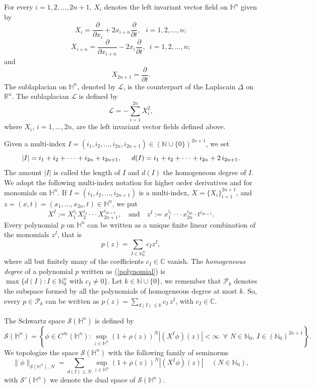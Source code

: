 \documentclass[oneside,10pt]{article}
\begin{document}
For every $i = 1,2, ..., 2n+1$, $X_i$ denotes the left invariant vector field on $\mathbb{H}^n$ given by
\[
X_i = \frac{\partial}{\partial x_i} + 2 x_{i+n} \frac{\partial}{\partial t}, \,\,\,\, i=1, 2, ..., n;
\]
\[
X_{i+n} = \frac{\partial}{\partial x_{i+n}} - 2 x_{i} \frac{\partial}{\partial t}, \,\,\, i=1, 2, ..., n;
\]
and
\[
X_{2n+1} = \frac{\partial}{\partial t}.
\]
The sublaplacian on $\mathbb{H}^n$, denoted by $\mathcal{L}$, is the counterpart of the Laplacain $\Delta$ on $\mathbb{R}^n$. The sublaplacian $\mathcal{L}$ is defined by
\[
\mathcal{L} =- \sum_{i=1}^{2n} X_i^2,
\]
where $X_i$, $i= 1, ..., 2n$, are the left invariant vector fields defined above.

Given a multi-index $I=(i_1,i_2, ..., i_{2n}, i_{2n+1}) \in (\mathbb{N} \cup \{ 0 \})^{2n+1}$, we set
\[
|I| = i_1 + i_2 + \cdot \cdot \cdot + i_{2n} + i_{2n+1}, \hspace{.5cm} d(I) = i_1 + i_2 + \cdot \cdot \cdot + i_{2n} + 2 \, i_{2n+1}.
\]
The amount $|I|$ is called the length of $I$ and $d(I)$ the homogeneous degree of $I$. We adopt the following multi-index notation for
higher order derivatives and for monomials on $\mathbb{H}^{n}$. If $I=(i_1, i_2, ..., i_{2n+1})$ is a multi-index, 
$X = \{ X_i \}_{i=1}^{2n+1}$, and $z = (x,t) = (x_1, ..., x_{2n}, t) \in \mathbb{H}^{n}$, we put
\[
X^{I} := X_{1}^{i_1} X_{2}^{i_2} \cdot \cdot \cdot X_{2n+1}^{i_{2n+1}}, \,\,\,\,\,\, \text{and} \,\,\,\,\,\,
z^{I} := x_{1}^{i_1} \cdot \cdot \cdot x_{2n}^{i_{2n}} \cdot t^{i_{2n+1}}.
\]
Every polynomial $p$ on $\mathbb{H}^n$ can be written as a unique finite linear combination of the monomials $z^I$, that is
\begin{equation} \label{polynomial}
p(z) = \sum_{I \in \mathbb{N}_{0}^n} c_I z^I,
\end{equation}
where all but finitely many of the coefficients $c_I \in \mathbb{C}$ vanish. The \textit{homogeneous degree} of a polynomial $p$ written as 
(\ref{polynomial}) is $\max \{ d(I) : I \in \mathbb{N}_{0}^n \,\, \text{with} \,\, c_I \neq 0 \}$. Let $k \in \mathbb{N} \cup \{ 0 \}$, we 
remember that $\mathcal{P}_{k}$ denotes the subspace formed by all the polynomials of homogeneous degree at most $k$. So, every 
$p \in \mathcal{P}_{k}$ can be written as $p(z) = \sum_{d(I) \leq k} c_I \, z^I$, with $c_I \in \mathbb{C}$.

The Schwartz space $\mathcal{S}(\mathbb{H}^{n})$ is defined by
\[
\mathcal{S}(\mathbb{H}^{n}) = \left\{ \phi \in C^{\infty}(\mathbb{H}^{n}) : \sup_{z \in \mathbb{H}^{n}} (1+\rho(z))^{N} 
|(X^{I} \phi)(z)| < \infty \,\,\, \forall \,\, N \in \mathbb{N}_{0}, \, I \in (\mathbb{N}_{0})^{2n+1}  \right\}.
\]
We topologize the space $\mathcal{S}(\mathbb{H}^{n})$ with the following family of seminorms
\[
\| \phi \|_{\mathcal{S}(\mathbb{H}^{n}), \, N} = \sum_{d(I) \leq N} \sup_{z \in \mathbb{H}^{n}} (1+\rho(z))^{N} |(X^{I} \phi)(z)| \,\,\,\,\,\,\, (N \in \mathbb{N}_{0}),
\]
with $\mathcal{S}'(\mathbb{H}^{n})$ we denote the dual space of $\mathcal{S}(\mathbb{H}^{n})$. 
\end{document}
